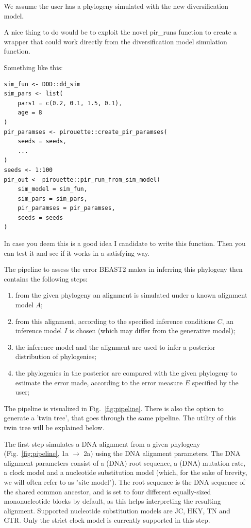 We assume the user has a phylogeny simulated with the new diversification model.

A nice thing to do would be to exploit the novel pir\_runs function to create a wrapper that could work directly from the diversification model simulation function.

Something like this:
\begin{lstlisting}
sim_fun <- DDD::dd_sim
sim_pars <- list(
    pars1 = c(0.2, 0.1, 1.5, 0.1),
    age = 8
)
pir_paramses <- pirouette::create_pir_paramses(
    seeds = seeds,
    ...
)
seeds <- 1:100
pir_out <- pirouette::pir_run_from_sim_model(
    sim_model = sim_fun,
    sim_pars = sim_pars,
    pir_paramses = pir_paramses,
    seeds = seeds
)
\end{lstlisting}
In case you deem this is a good idea I candidate to write this function. Then you can test it and see if it works in a satisfying way.

The pipeline to assess the error BEAST2 makes in inferring this phylogeny 
then contains the following steps:
\begin{enumerate}
  \item from the given phylogeny an alignment is simulated 
    under a known alignment model $\mathit{A}$;
  \item from this alignment, according to the specified 
    inference conditions $\mathit{C}$, 
    an inference model $\mathit{I}$ is chosen (which may differ from the 
    generative model);
  \item the inference model and the alignment are used 
    to infer a posterior distribution of phylogenies;
  \item the phylogenies in the posterior are compared with the given phylogeny 
    to estimate the error made, according to 
    the error measure $\mathit{E}$ specified by the user;
\end{enumerate}
The pipeline is visualized in Fig.~\ref{fig:pipeline}. 
There is also the option to generate a 'twin tree', 
that goes through the same pipeline. 
The utility of this twin tree will be explained below.

The first step simulates a DNA alignment from a given 
phylogeny (Fig.~\ref{fig:pipeline}, 1a $\rightarrow$ 2a)
using the DNA alignment parameters.
The DNA alignment parameters consist of 
a (DNA) root sequence, a (DNA) mutation rate, a clock model 
and a nucleotide substitution model (which, for the sake of brevity, we will often refer to as "site model").
The root sequence is the DNA sequence of the shared common ancestor,
and is set to four different equally-sized mononucleotide blocks by default, as this
helps interpreting the resulting alignment.
Supported nucleotide substitution models
are JC, HKY, TN and GTR. Only the strict
clock model is currently supported in this step.

